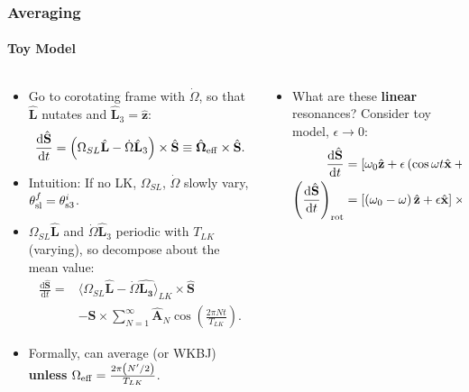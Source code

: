 \documentclass[dvipsnames, 8pt]{beamer}
\newcommand*{\rd}[2]{\frac{\mathrm{d}#1}{\mathrm{d}#2}}
\newcommand*{\bm}[1]{\boldsymbol{\mathbf{#1}}}
\newcommand*{\uv}[1]{\hat{\bm{#1}}}
\newcommand*{\ev}[1]{\langle#1\rangle}
\newcommand*{\p}[1]{\left(#1\right)}
\newcommand*{\s}[1]{\left[#1\right]}
\begin{document}
\begin{frame}
    \frametitle{Averaging}
    \framesubtitle{Toy Model}

    \begin{columns}
        \begin{column}{0.5\textwidth}
            \begin{itemize}
                \item Go to corotating frame with $\dot{\Omega}$, so that
                    $\uv{L}$ nutates and $\uv{L}_3 = \uv{z}$:
                    \begin{equation}
                        \rd{\uv{S}}{t} = \p{\Omega_{SL} \uv{L}
                            - \dot{\Omega} \uv{L}_3} \times \uv{S}
                            \equiv \uv{\Omega}_{\rm eff} \times \uv{S}.
                    \end{equation}

                \item Intuition: If no LK, $\Omega_{SL}$, $\dot{\Omega}$ slowly
                    vary, $\theta_{\rm sl}^f = \theta_{\rm s3}^i$.

                \item $\Omega_{SL}\uv{L}$ and $\dot{\Omega}\uv{L}_3$ periodic
                    with $T_{LK}$ (varying), so decompose about the mean value:
                    \begin{align}
                        \rd{\uv{S}}{t} ={}&
                            \ev{\Omega_{SL}\uv{L} - \dot{\Omega} \uv{L_3}}_{LK}
                                \times \uv{S}\nonumber\\
                            &- \bm{S} \times \sum\limits_{N = 1}^\infty \uv{A}_N
                                \cos \p{\frac{2\pi N t}{T_{LK}}}.
                    \end{align}

                \item Formally, can average (or WKBJ) \textbf{unless}
                    $\Omega_{\rm eff} = \frac{2\pi \p{N' / 2}}{T_{LK}}$.
            \end{itemize}
        \end{column}
        \begin{column}{0.5\textwidth}
            \begin{itemize}
                \item What are these \textbf{linear} resonances? Consider toy
                    model, $\epsilon \to 0$:
                    \begin{align}
                        \rd{\uv{S}}{t} &= \s{\omega_0 \uv{z}
                            + \epsilon\p{\cos \omega t \uv{x} + \sin
                            \omega t \uv{y}}} \times \uv{S},\\
                        \p{\rd{\uv{S}}{t}}_{\rm rot} &=
                            \s{\p{\omega_0 - \omega}\uv{z} + \epsilon
                                \uv{x}} \times \uv{S}.
                    \end{align}


\end{itemize}
\end{column}
\end{columns}
\end{frame}
\end{document}
